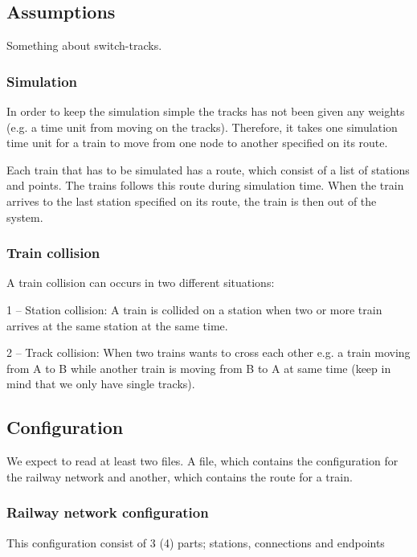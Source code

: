 \documentclass[10pt,a4paper]{article}
\begin{document}
\subsection{Assumptions}
Something about switch-tracks.

\subsubsection{Simulation}
 
In order to keep the simulation simple the tracks has not been given any weights (e.g. a time unit from moving on the tracks). Therefore, it takes one simulation time unit for a train to move from one node to another specified on its route.
 
Each train that has to be simulated has a route, which consist of a list of stations and points. The trains follows this route during simulation time. When the train arrives to the last station specified on its route, the train is then out of the system.
 
\subsubsection{Train collision}
 
A train collision can occurs in two different situations:
 
1 – Station collision:
A train is collided on a station when two or more train arrives at the same station at the same time.
 
2 – Track collision:
When two trains wants to cross each other e.g. a train moving from A to B while another train is moving from B to A at same time (keep in mind that we only have single tracks).


\subsection{Configuration}
 
We expect to read at least two files. A file, which contains the configuration for the railway network and another, which contains the route for a train.  
 
\subsubsection{Railway network configuration}
 
This configuration consist of 3 (4) parts; stations, connections and endpoints
\end{document}
